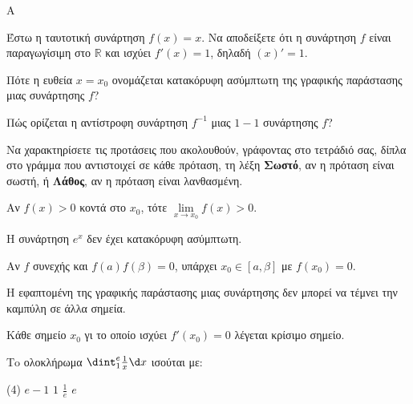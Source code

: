 \begin{thema}{A}
\begin{erwthma}
    \item Έστω η ταυτοτική συνάρτηση $ f(x)=x $. Να αποδείξετε ότι η συνάρτηση $ f $ είναι παραγωγίσιμη στο $ \mathbb{R} $ και ισχύει $ f'(x)=1 $, δηλαδή $ (x)'=1 $.
    \item Πότε η ευθεία $x=x_0$ ονομάζεται κατακόρυφη ασύμπτωτη της γραφικής παράστασης μιας συνάρτησης $f$?
    \item Πώς ορίζεται η αντίστροφη συνάρτηση $f^{-1}$ μιας $1-1$ συνάρτησης $f$?
    \item Να χαρακτηρίσετε τις προτάσεις που ακολουθούν, γράφοντας στο τετράδιό σας, δίπλα στο γράμμα που αντιστοιχεί σε κάθε πρόταση, τη λέξη \textbf{Σωστό}, αν η πρόταση είναι σωστή, ή \textbf{Λάθος}, αν η πρόταση είναι λανθασμένη.
    \begin{alist}
        \item Αν $f(x) > 0$ κοντά στο $x_0$, τότε $\lim\limits_{x\to x_0} f(x) > 0$.
        \item H συνάρτηση $e^x$ δεν έχει κατακόρυφη ασύμπτωτη.
        \item Αν $f$ συνεχής και $f(a)f(\beta)=0$, υπάρχει $x_0 \in [a, \beta]$ με $f(x_0)=0$.
        \item Η εφαπτομένη της γραφικής παράστασης μιας συνάρτησης δεν μπορεί να τέμνει την καμπύλη σε άλλα σημεία.
        \item Κάθε σημείο $x_0$ γι το οποίο ισχύει $f'(x_0)=0$ λέγεται κρίσιμο σημείο.
    \end{alist}
    \item Τo ολοκλήρωμα $\dint_1^e \frac{1}{x} \d x$ ισούται με:
    \begin{tasks}[label=\let\textdexiakeraia\relax\alph*.](4)
        \task $e-1$
        \task $1$
        \task $\frac{1}{e}$
        \task $e$
    \end{tasks}
\end{erwthma}
\end{thema}


